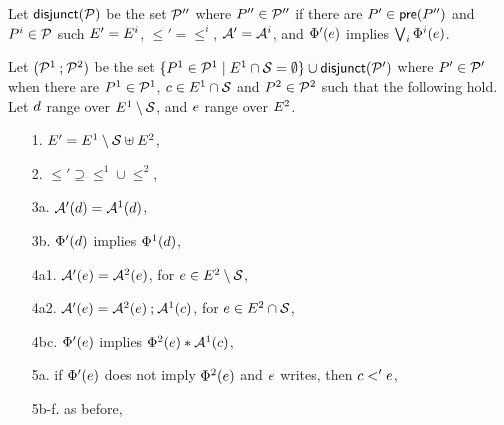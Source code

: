 \begin{definition}
  \label{def:semi:seq}
  Let $\mathsf{disjunct}(\mathcal{P})$ be the set $\mathcal{P}''$ where $P''\in\mathcal{P}''$ if
  there are $P'\in\mathsf{pre}(P'')$ and $P^i\in\mathcal{P}$ such
  $E' = E^i$, ${\le'}={\le^i}$, $\mathcal{A}'=\mathcal{A}^i$, and
  $\Phi'(e)$ implies $\bigvee_i \Phi^i(e)$.
  

  Let $(\mathcal{P}^1 \mathbin; \mathcal{P}^2)$ be the set
  $\{P^1\in\mathcal{P}^1\mid E^1\cap\mathcal{S}=\emptyset\}\cup \mathsf{disjunct}(\mathcal{P}')$
  where $P'\in\mathcal{P}'$ when there are $P^1 \in \mathcal{P}^1$,
  $c\in E^1\cap\mathcal{S}$ and $P^2\in\mathcal{P}^2$ such that the following
  hold.  Let $d$ range over $E^1\setminus\mathcal{S}$, and $e$ range over
  $E^2$.
\begin{enumerate}
\item[1.] $E' = E^1\setminus\mathcal{S} \uplus E^2$,
\item[2.] ${\le'}\supseteq{\le^1}\cup{\le^2}$, 
\item[3a.] $\mathcal{A}'(d) = \mathcal{A}^1(d)$,
\item[3b.] $\Phi'(d)$ implies $\Phi^1(d)$,
\item[4a1.] $\mathcal{A}'(e) = \mathcal{A}^2(e)$,  for $e\in E^2\setminus\mathcal{S}$,
\item[4a2.] $\mathcal{A}'(e) =  \mathcal{A}^2(e)\mathbin{;}\mathcal{A}^1(c)$,  for $e\in E^2\cap\mathcal{S}$, 
\item[4bc.] $\Phi'(e)$ implies $\Phi^2(e)\mathbin{\ast}\mathcal{A}^1(c)$,
\item[5a.] if $\Phi'(e)$ does not imply $\Phi^2(e)$ and
  $e$ writes, then $c<'e$,
\item[5b-f.] as before,

\end{enumerate}
\end{definition}
